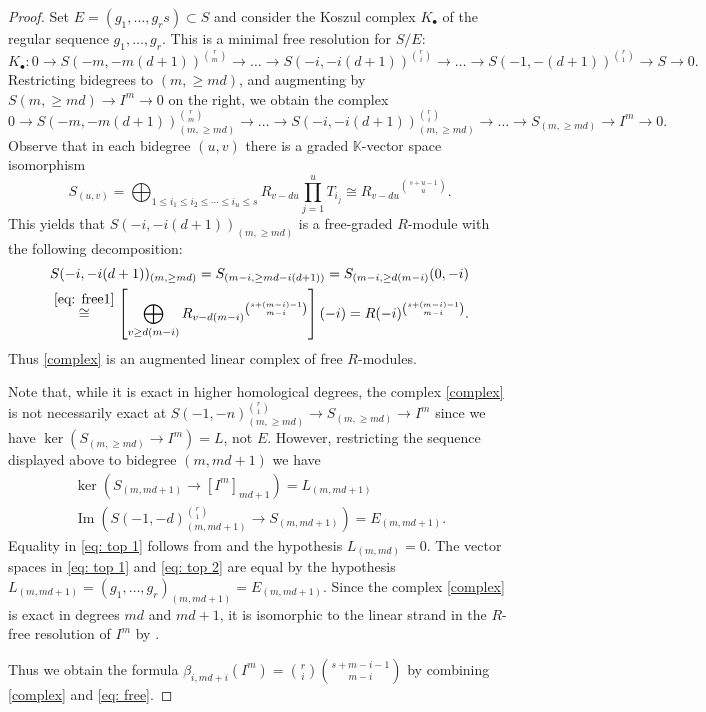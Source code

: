 \documentclass[reqno]{amsart}
\theoremstyle{definition}
\theoremstyle{remark}
\numberwithin{equation}{section}
\DeclareMathOperator{\Img}{Im}
\begin{document}
\begin{proof}
    Set $E=(g_1, \ldots, g_rs)\subset S$ and consider the Koszul complex $K_\bullet$ of  the regular sequence $g_1,\dots, g_r$. This is a minimal free resolution for $S/E$: 
    \[K_{\bullet}: 0 \to S(-m, -m(d+1))^{r \choose m} \to \ldots \to S(-i, -i(d+1))^{r \choose i} \to \ldots \to S(-1,-(d+1))^{r \choose 1} \to S \to 0.\]
Restricting bidegrees to $(m, \geq md)$,
    and augmenting by $S(m, \geq md)\to I^m \to 0$ on the right, we obtain the complex
    \begin{equation}\label{complex}
    0 \to S(-m, -m(d+1))^{r \choose m}_{(m, \geq md)} \to \ldots \to S(-i, -i(d+1))_{(m, \geq md)}^{r \choose i} \to \ldots \to S_{(m, \geq md)} \to I^m \to 0.
    \end{equation}
 Observe that in each bidegree $(u,v)$ there is a graded $\mathbb{K}$-vector space isomorphism
 \begin{equation}\label{eq: free1}
 S_{(u,v)}=\bigoplus_{1\leq i_1\leq i_2\leq \cdots \leq i_u\leq s}R_{v-du}\prod_{j=1}^u T_{i_j} \cong {R_{v-du}}^{\binom{s+u-1}{u}}.
 \end{equation}
This yields that
 $S(-i, -i(d+1))_{(m, \geq md)}$ is a free-graded $R$-module with the following decomposition:
    \begin{equation}\label{eq: free}
    \begin{split}
        S(-i, -i(d+1))_{(m, \geq md)} = S_{(m-i, \geq md-i(d+1))} 
    = S_{(m-i, \geq d(m-i)} (0,-i) \\ 
    \stackrel{\eqref{eq: free1}}{\cong} \left[ \bigoplus_{v \geq d(m-i)} {R_{v-d(m-i)}}^{\binom{s + (m-i) -1}{m-i}}\right](-i) = 
    R(-i)^{\binom{s + (m-i) -1}{m-i}}.
     \end{split}
     \end{equation}
Thus \eqref{complex} is an augmented linear complex of free $R$-modules.
    
    Note that, while it is exact in higher homological degrees, the complex \eqref{complex} is not necessarily exact at $S(-1, -n)_{(m, \geq md)}^{r \choose 1} \to S_{(m, \geq md)} \to I^m$ since we have $\ker(S_{(m, \geq md)} \to I^m) = L$, not $E$. 
However, restricting the sequence displayed above to bidegree $(m,md+1)$ we have
    \begin{eqnarray}
        \ker(S_{(m,  md+1)} \to [I^m]_{md+1})=L_{(m,md+1)} \label{eq: top 1}\\
        \Img(S(-1,-d)_{(m,  md+1)}^{\binom{r}{1}}\to S_{(m,  md+1)}) =E_{(m,md+1)} \label{eq: top 2}.
    \end{eqnarray}
Equality in \eqref{eq: top 1} follows from    and the hypothesis $L_{(m,md)}=0$. 
The vector spaces in \eqref{eq: top 1} and \eqref{eq: top 2}  are equal
by the hypothesis $L_{(m,md+1)}=(g_1, \dots, g_r)_{(m,md+1)}=E_{(m,md+1)}$. Since the complex \eqref{complex} is exact in degrees $md$ and $md+1$, it is isomorphic to the linear strand in the $R$-free resolution of $I^m$ by \cite[Corollary 1.2]{HKM}.
    
   Thus we obtain the formula $\beta_{i, md + i}(I^m) = {r \choose i}{s+m-i-1 \choose m-i}$ by combining \eqref{complex} and \eqref{eq: free}.
\end{proof}
\end{document}
